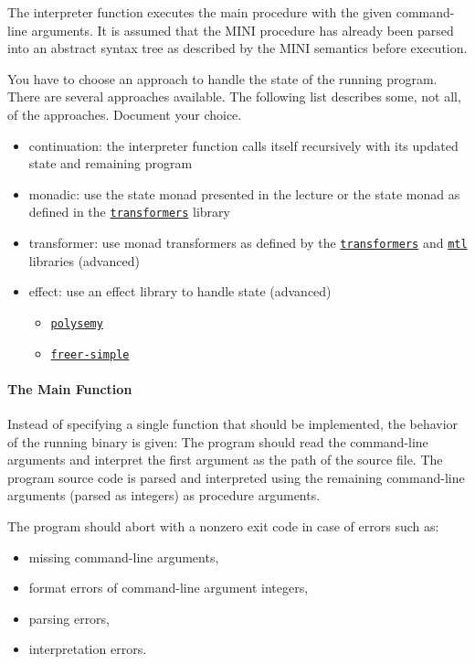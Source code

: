 \documentclass{article}
\begin{document}
The interpreter function executes the main procedure with the given command-line arguments. It is assumed that the MINI procedure has already been parsed into an abstract syntax tree as described by the MINI semantics before execution.

You have to choose an approach to handle the state of the running program. There are several approaches available. The following list describes some, not all, of the approaches. Document your choice.

\begin{itemize}
\item continuation: the interpreter function calls itself recursively with its updated state and remaining program
\item monadic: use the state monad presented in the lecture or the state monad as defined in the \href{https://hackage.haskell.org/package/transformers}{\texttt{transformers}} library
\item transformer: use monad transformers as defined by the \href{https://hackage.haskell.org/package/transformers}{\texttt{transformers}} and \href{https://hackage.haskell.org/package/mtl}{\texttt{mtl}} libraries (advanced)
\item effect: use an effect library to handle state (advanced)
    \begin{itemize}
    \item \href{https://hackage.haskell.org/package/polysemy}{\texttt{polysemy}}
    \item \href{https://hackage.haskell.org/package/freer-simple}{\texttt{freer-simple}}
    \end{itemize}
\end{itemize}

\paragraph{The Main Function}

Instead of specifying a single function that should be implemented, the behavior of the running binary is given: The program should read the command-line arguments and interpret the first argument as the path of the source file. The program source code is parsed and interpreted using the remaining command-line arguments (parsed as integers) as procedure arguments.

The program should abort with a nonzero exit code in case of errors such as:

\begin{itemize}
\item missing command-line arguments,
\item format errors of command-line argument integers,
\item parsing errors,
\item interpretation errors.
\end{itemize}
\end{document}
